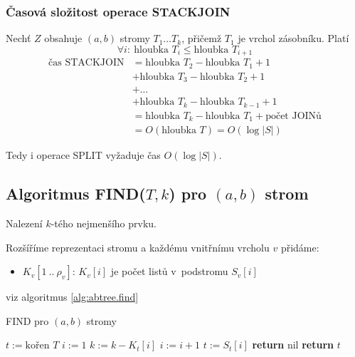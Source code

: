 \subsubsection{Časová složitost operace STACKJOIN}

Nechť $Z$ obsahuje $(a,b)$ stromy $T_1 \dots T_k$, přičemž $T_1$ je
vrchol zásobníku.
Platí
\[
\forall i:\ \text{hloubka }T_i \leq \text{hloubka }T_{i+1}
\]
\begin{align*}
\text{čas STACKJOIN}
 & = \text{hloubka }T_2 - \text{hloubka }T_1 + 1 \\
 & + \text{hloubka }T_3 - \text{hloubka }T_2 + 1 \\
 & + \dots \\
 & + \text{hloubka }T_k - \text{hloubka }T_{k-1} + 1 \\
 & = \text{hloubka }T_k - \text{hloubka }T_1 + \text{počet JOINů} \\
 & = O(\text{hloubka }T) = O(\log |S|)
\end{align*}

Tedy i operace SPLIT vyžaduje čas $O(\log |S|)$.

\subsection{Algoritmus FIND($T, k$) pro $(a,b)$ strom}

Nalezení $k$-tého nejmenšího prvku.

Rozšíříme reprezentaci stromu a každému vnitřnímu vrcholu $v$ přidáme:
\begin{itemize}
\item $K_v[1\ .. \ \rho_v]$: $K_v[i]$ je počet listů
v~podstromu $S_v[i]$ 
\end{itemize}

viz algoritmus \ref{alg:abtree.find}

\begin{algorithm}[!htb]
\caption{FIND pro $(a,b)$ stromy}
\label{alg:abtree.find}
\begin{algorithmic}
\STATE $t := \text{kořen }T$
	\STATE $i := 1$
		\STATE $k := k - K_t[i]$ 
		\STATE $i := i + 1$ 
	\ENDWHILE
	\STATE $t := S_t[i]$ 
\ENDWHILE
{}
	\STATE \textbf{return} nil 
\ELSE
	\STATE \textbf{return} $t$
\ENDIF
\end{algorithmic}
\end{algorithm}

